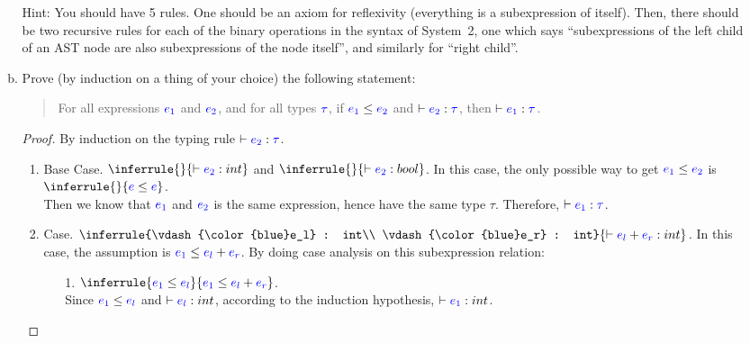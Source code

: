 \documentclass{article}
\newcommand{\meta}[1]{{\color{blue}#1}}
\begin{document}
\begin{enumerate}[leftmargin=*,itemindent=*,start=6,label={{\bf Problem \arabic*}.},ref=\arabic*]
\begin{enumerate}[(a)]
    Hint: You should have 5 rules. One should be an axiom for reflexivity (everything is a subexpression of itself).
    Then, there should be two recursive rules for each of the binary operations in the syntax of System~2,
    one which says ``subexpressions of the left child of an AST node are also subexpressions of the node itself'',
    and similarly for ``right child''.

  \item \label{subexppf}Prove (by induction on a thing of your choice) the following statement:
    \begin{quote}
      For all expressions $\meta{e_1}$ and $\meta{e_2}$, and for all types $\meta{\tau}$,
      if $\meta{e_1} \le \meta{e_2}$ and $\vdash \meta{e_2} : \meta{\tau}$,
      then $\vdash \meta{e_1} : \meta{\tau}$.
    \end{quote}

    \begin{proof}
      By induction on the typing rule $\vdash \meta{e_2} : \meta{\tau}$.
      \begin{enumerate}
        \item Base Case. $\inferrule{ }{\vdash \meta{e_2} : int}$ and $\inferrule{ }{\vdash \meta{e_2} : bool}$. In this case, the only possible way to get $\meta{e_1} \leq \meta{e_2}$ is $\inferrule{ }{\meta{e} \leq \meta{e}}$.\\
        Then we know that $\meta{e_1}$ and $\meta{e_2}$ is the same expression, hence have the same type $\tau$. Therefore, $\vdash \meta{e_1} : \meta{\tau}$.
        
        \item Case. $\inferrule{\vdash \meta{e_l} : int\\ \vdash \meta{e_r} : int}{\vdash \meta{e_l} + \meta{e_r} : int}$. In this case, the assumption is $\meta{e_1} \leq \meta{e_l} + \meta{e_r}$. By doing case analysis on this subexpression relation:
          \begin{itemize}
            \item [1.] $\inferrule{\meta{e_1} \leq \meta{e_l}}{\meta{e_1} \leq \meta{e_l} + \meta{e_r}}$. \\
            Since $\meta{e_1} \leq \meta{e_l}$ and $\vdash \meta{e_l} : int$, according to the induction hypothesis, $\vdash \meta{e_1} : int$.
            

\end{itemize}
\end{enumerate}
\end{proof}
\end{enumerate}
\end{enumerate}
\end{document}
